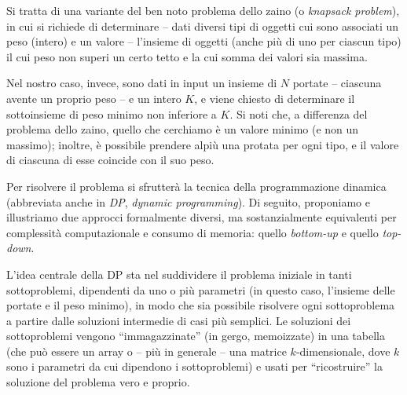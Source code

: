 
    
    Si tratta di una variante del ben noto problema dello zaino (o \textit{knapsack problem}), in cui si richiede di determinare -- dati diversi tipi di oggetti cui sono associati un peso (intero) e un valore -- l'insieme di oggetti (anche più di uno per ciascun tipo) il cui peso non superi un certo tetto e la cui somma dei valori sia massima.

    Nel nostro caso, invece, sono dati in input un insieme di $N$ portate -- ciascuna avente un proprio peso -- e un intero $K$, e viene chiesto di determinare il sottoinsieme di peso minimo non inferiore a $K$. Si noti che, a differenza del problema dello zaino, quello che cerchiamo è un valore minimo (e non un massimo); inoltre, è possibile prendere alpiù una protata per ogni tipo, e il valore di ciascuna di esse coincide con il suo peso.
    
    Per risolvere il problema si sfrutterà la tecnica della programmazione dinamica (abbreviata anche in \textit{DP}, \textit{dynamic programming}). Di seguito, proponiamo e illustriamo due approcci formalmente diversi, ma sostanzialmente equivalenti per complessità computazionale e consumo di memoria: quello \textit{bottom-up} e quello \textit{top-down}.
    
    \BottomUp
    
    L'idea centrale della DP sta nel suddividere il problema iniziale in tanti sottoproblemi, dipendenti da uno o più parametri (in questo caso, l'insieme delle portate e il peso minimo), in modo che sia possibile risolvere ogni sottoproblema a partire dalle soluzioni intermedie di casi più semplici. Le soluzioni dei sottoproblemi vengono ``immagazzinate'' (in gergo, memoizzate) in una tabella (che può essere un array o -- più in generale -- una matrice $k$-dimensionale, dove $k$ sono i parametri da cui dipendono i sottoproblemi) e usati per ``ricostruire'' la soluzione del problema vero e proprio.
    
    \begin{figure}
        \vspace*{-.9cm}
        \begin{flushright}
        \end{flushright}
        \vspace*{-.5cm}
    \end{figure}
    
